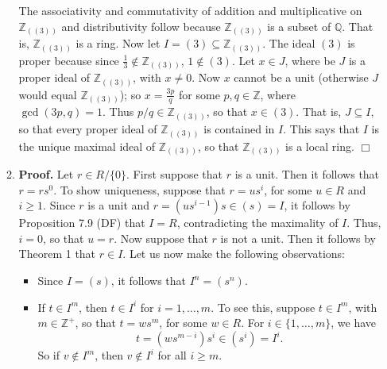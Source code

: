 \documentclass[9pt]{article}
\newcommand{\qed}{\hfill \ensuremath{\Box}}
\newcommand{\Z}{\mathbb{Z}}
\newcommand{\Q}{\mathbb{Q}}
\begin{document}
\begin{enumerate}
\begin{enumerate}
               The associativity and commutativity of addition and
               multiplicative on $\Z_{((3))}$ and distributivity follow because
               $\Z_{((3))}$ is a subset of $\Q$. That is,
               $\Z_{((3))}$ is a ring.
               Now let $I = (3) \subseteq \Z_{((3))}$. The ideal $(3)$ is proper
               because since $\frac{1}{3} \notin \Z_{((3))}$, $1 \notin (3)$.
               Let $x \in J$, where be $J$ is a proper ideal of $\Z_{((3))}$,
               with $x \neq 0$. Now $x$ cannot be a unit (otherwise $J$ would equal $\Z_{((3))}$);
               so $x = \frac{3p}{q}$ for some $p, q \in \Z$, where
               $\gcd(3p, q) = 1$. Thus $p/q \in \Z_{((3))}$, so that
               $x \in (3)$. That is, $J \subseteq I$, so that every proper ideal
               of $\Z_{((3))}$ is contained in $I$. This says that $I$ is the
               unique maximal ideal of $\Z_{((3))}$, so that $\Z_{((3))}$ is a
               local ring. \qed
         \item \textbf{Proof.} Let $r \in R/\{0\}$. First suppose that $r$ is a
               unit. Then it follows that $r = rs^0$. To show uniqueness,
               suppose that $r = us^i$, for some $u \in R$ and $i \ge 1$. Since
               $r$ is a unit and $r = (us^{i-1})s \in (s) = I$, it follows by
               Proposition 7.9 (DF) that $I = R$, contradicting the maximality
               of $I$. Thus, $i = 0$, so that $u = r$. Now suppose that $r$ is
               not a unit. Then it follows by Theorem 1 that $r \in I$. Let us
               now make the following observations:
               \begin{itemize}
                  \item Since $I = (s)$, it follows that $I^n = (s^n)$.
                  \item If $t \in I^m$, then $t \in I^i$ for $i = 1, \ldots, m$.
                        To see this, suppose $t \in I^m$, with $m \in \Z^+$, so
                        that $t = ws^m$, for some $w \in R$. For
                        $i \in \{1, \ldots, m\}$, we have
                        $$t = (ws^{m-i})s^i \in (s^i) = I^i.$$
                        So if $v \notin I^m$, then $v \notin I^i$ for all
                        $i \ge m$.
               \end{itemize}


\end{enumerate}
\end{enumerate}
\end{document}

